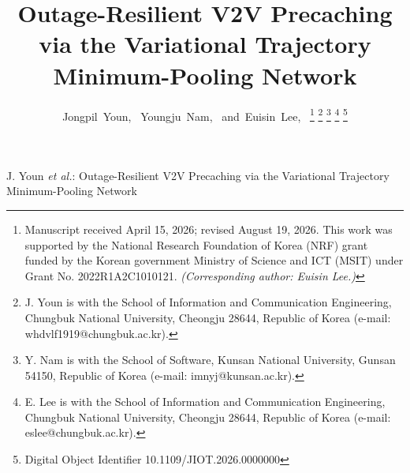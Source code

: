 \documentclass[journal]{IEEEtran}
\begin{document}
\title{Outage-Resilient V2V Precaching via the Variational Trajectory Minimum-Pooling Network}

\author{Jongpil~Youn,~
        Youngju~Nam,~
        and~Euisin~Lee,~%
\thanks{Manuscript received April 15, 2026; revised August 19, 2026.
This work was supported by the National Research Foundation of Korea (NRF) grant funded by the Korean government Ministry of Science and ICT (MSIT) under Grant No. 2022R1A2C1010121.
\textit{(Corresponding author: Euisin Lee.)}}%
\thanks{J. Youn is with the School of Information and Communication Engineering,
Chungbuk National University, Cheongju 28644, Republic of Korea (e-mail: whdvlf1919@chungbuk.ac.kr).}%
\thanks{Y. Nam is with the School of Software, Kunsan National University,
Gunsan 54150, Republic of Korea (e-mail: imnyj@kunsan.ac.kr).}%
\thanks{E. Lee is with the School of Information and Communication Engineering,
Chungbuk National University, Cheongju 28644, Republic of Korea (e-mail: eslee@chungbuk.ac.kr).}%
\thanks{Digital Object Identifier 10.1109/JIOT.2026.0000000}}

%
{J. Youn \MakeLowercase{\textit{et al.}}: Outage-Resilient V2V Precaching via the Variational Trajectory Minimum-Pooling Network}


\maketitle
\end{document}
